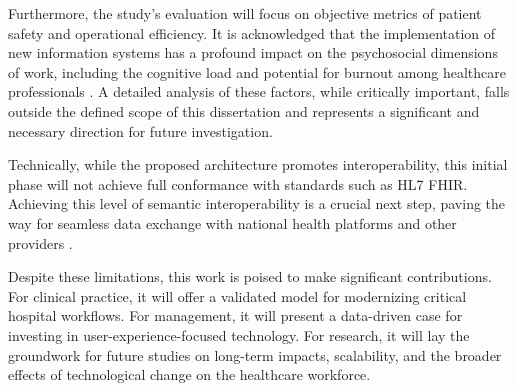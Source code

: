 Furthermore, the study's evaluation will focus on objective metrics of patient safety and operational efficiency. It is acknowledged that the implementation of new information systems has a profound impact on the psychosocial dimensions of work, including the cognitive load and potential for burnout among healthcare professionals \cite{hertzum2022}. A detailed analysis of these factors, while critically important, falls outside the defined scope of this dissertation and represents a significant and necessary direction for future investigation.

Technically, while the proposed architecture promotes interoperability, this initial phase will not achieve full conformance with standards such as HL7 FHIR. Achieving this level of semantic interoperability is a crucial next step, paving the way for seamless data exchange with national health platforms and other providers \cite{mandl2020}.

Despite these limitations, this work is poised to make significant contributions. For clinical practice, it will offer a validated model for modernizing critical hospital workflows. For management, it will present a data-driven case for investing in user-experience-focused technology. For research, it will lay the groundwork for future studies on long-term impacts, scalability, and the broader effects of technological change on the healthcare workforce. 